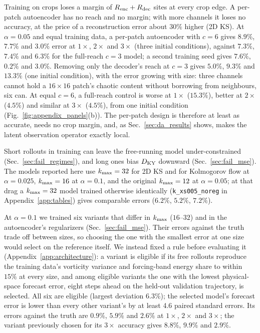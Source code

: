  Training on crops loses a margin of
$R_{\mathrm{enc}}+R_{\mathrm{dec}}$ sites at every crop edge. A per-patch autoencoder has no
reach and no margin; with more channels it loses no accuracy, at the
price of a reconstruction error about $30\%$ higher (2D KS). At
$\alpha=0.05$ and equal training data, a per-patch autoencoder with
$c=6$ gives $8.9\%$, $7.7\%$ and $3.0\%$ error at $1\times$, $2\times$ and
$3\times$ (three initial conditions), against $7.3\%$, $7.4\%$ and $6.3\%$
for the full-reach $c=3$ model; a second training seed gives $7.6\%$,
$0.2\%$ and $3.0\%$. Removing only the decoder's reach at $c=3$ gives
$5.0\%$, $9.3\%$ and $13.3\%$ (one initial condition), with the error
growing with size: three channels cannot hold a $16\times16$ patch's
chaotic content without borrowing from neighbours, six can. At equal
$c=6$, a full-reach control is worse at $1\times$ ($15.3\%$), better at
$2\times$ ($4.5\%$) and similar at $3\times$ ($4.5\%$), from one initial
condition (Fig.~\ref{fig:appendix_panels}(b)). The per-patch
design is therefore at least as accurate, needs no crop margin, and, as
Sec.~\ref{sec:da_results} shows, makes the latent observation operator
exactly local.

 Short rollouts in training can leave the
free-running model under-constrained (Sec.~\ref{sec:fail_regimes}), and
long ones bias $D_{\mathrm{KY}}$ downward (Sec.~\ref{sec:fail_mse}). The models
reported here use $k_{\max}=32$ for 2D KS and for Kolmogorov flow at
$\alpha=0.025$, $k_{\max}=16$ at $\alpha=0.1$, and the original $k_{\max}=12$ at
$\alpha=0.05$; at that drag a $k_{\max}=32$ model trained otherwise identically
(\texttt{k\_xs005\_noreg} in Appendix~\ref{app:tables}) gives
comparable errors ($6.2\%$, $5.2\%$, $7.2\%$).

 At $\alpha=0.1$ we trained six
variants that differ in $k_{\max}$ ($16$--$32$) and in the autoencoder's
regularizers (Sec.~\ref{sec:fail_mse}). Their errors against the truth
trade off between sizes, so choosing the one with the smallest error at
one size would select on the reference itself. We instead fixed a rule
before evaluating it (Appendix~\ref{app:architecture}): a variant is
eligible if its free rollouts reproduce the training data's vorticity
variance and forcing-band energy share to within $15\%$ at every size,
and among eligible variants the one with the lowest physical-space
forecast error, eight steps ahead on the held-out validation trajectory,
is selected. All six are eligible (largest deviation $6.3\%$); the
selected model's forecast error is lower than every other variant's by
at least 4.6 paired standard errors. Its errors against the truth are
$0.9\%$, $5.9\%$ and $2.6\%$ at $1\times$, $2\times$ and $3\times$; the
variant previously chosen for its $3\times$ accuracy gives $8.8\%$,
$9.9\%$ and $2.9\%$.

